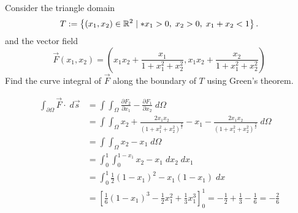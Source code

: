\documentclass[11pt]{article}
\begin{document}
\begin{exercise}
    Consider the triangle domain 
    \[
        T := \left\{ (x_1,x_2) \in \bbR^{2} \suchthat* x_1 > 0, \; x_2 > 0, \; x_1+x_2 < 1 \right\}.
    \]
    and the vector field 
    \[
        \vec F(x_1,x_2) = \left( x_1x_2 + \frac{x_1}{1+x_1^2+x_2^2}, x_1x_2 + \frac{x_2}{1+x_1^2+x_2^2} \right)
    \]
    Find the curve integral of $\vec F$ along the boundary of $T$ using Green's theorem.
\end{exercise}
\begin{solution}
\begin{align*}
    \int_{\partial \Omega} \vec{F} \cdot \; d \vec{s} &= \int\int_{\Omega} \frac{\partial F_2}{\partial x_1} - \frac{\partial F_1}{\partial x_2}\; d \Omega\\
&= \int\int_{\Omega} x_2 + \frac{2x_1x_2}{(1+x_1^ 2 + x_2^ 2)^ {\frac{3}{2}}} - x_1 - \frac{2x_1x_2}{(1+x_1^ 2 + x_2^ 2)^ {\frac{3}{2}}} \; d \Omega\\
&= \int\int_{\Omega} x_2  - x_1\; d \Omega\\
&= \int_0^ 1\int_0^ {1-x_1} x_2 - x_1 \;dx_2\;dx_1\\
&= \int_0^ 1 \frac{1}{2}(1-x_1)^ 2 - x_1(1-x_1) \;d x\\
&= \left[ \frac{1}{6}(1-x_1)^ 3 - \frac{1}{2} x_1^2 + \frac{1}{3}x_1^ 3 \right]_0^1 = -\frac{1}{2} + \frac{1}{3} - \frac{1}{6} = -\frac{2}{6}
\end{align*}
\end{solution}
\end{document}
